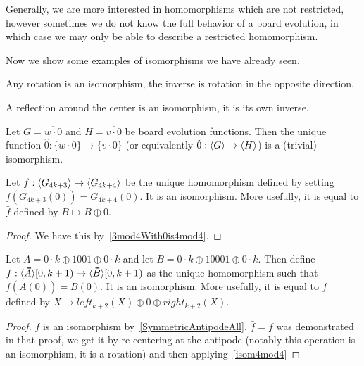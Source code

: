 \documentclass[12pt,letterpaper]{article}
\begin{document}
Generally, we are more interested in homomorphisms which are not restricted, however sometimes we do not know the full behavior of a board evolution, in which case we may only be able to describe a restricted homomorphism.

Now we show some examples of isomorphisms we have already seen.
\addtocounter{prop}{1}
\begin{innerProp}\label{isomRotation}
  Any rotation is an isomorphism, the inverse is rotation in the opposite direction.
\end{innerProp}
\begin{innerProp}\label{isomReflection}
  A reflection around the center is an isomorphism, it is its own inverse.
\end{innerProp}
\begin{innerProp}\label{isomDead}
  Let $G=\overline{w\cdot 0}$ and $H=\overline{v\cdot 0}$ be board evolution functions. Then the unique function $\hat 0:\{w\cdot 0\}\rightarrow \{v\cdot 0\}$ (or equivalently $\hat 0:\langle G\rangle\rightarrow\langle H\rangle$) is a (trivial) isomorphism.
\end{innerProp}
\begin{innerProp}\label{isom4mod4}
  Let $f:\langle G_{4k+3}\rangle\rightarrow \langle G_{4k+4}\rangle$ be the unique homomorphism defined by setting $f(G_{4k+3}(0))=G_{4k+4}(0)$. It is an isomorphism. More usefully, it is equal to $\bar f$ defined by $B\mapsto B\oplus 0$. %
\end{innerProp}
\begin{proof}
  We have this by~\cref{3mod4With0is4mod4}.
\end{proof}
\begin{innerProp}\label{isom1001-10001}
  Let $A=0\cdot k\oplus 1001\oplus 0\cdot k$ and let $B=0\cdot k\oplus 10001\oplus 0\cdot k$. Then define $f:\angled{\bar A}[0,k+1)\rightarrow \angled{\bar B}[0,k+1)$ as the unique homomorphism such that $f(\bar A(0))=\bar B(0)$. It is an isomorphism. More usefully, it is equal to $\bar f$ defined by $X\mapsto left_{k+2}(X)\oplus 0\oplus right_{k+2}(X)$.
\end{innerProp}
\begin{proof}
  $f$ is an isomorphism by~\cref{SymmetricAntipodeAll}. $\bar f = f$ was demonstrated in that proof, we get it by re-centering at the antipode (notably this operation is an isomorphism, it is a rotation) and then applying~\cref{isom4mod4}
\end{proof}

\end{document}
